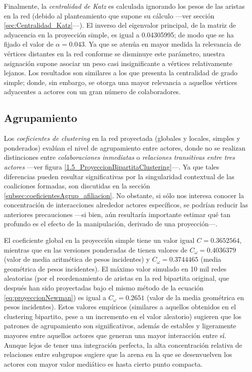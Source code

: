 \documentclass[letterpaper, 11pt]{book}
\theoremstyle{definition}
\theoremstyle{remark}
\begin{document}
Finalmente, la \emph{centralidad de Katz} es calculada ignorando los pesos de las aristas en la red (debido al planteamiento que supone su cálculo ---ver sección \ref{sec:Centralidad_Katz}---). 
El inverso del eigenvalor principal, de la matriz de adyacencia en la proyección simple, es igual a 0.04305995; de modo que se ha fijado el valor de $\alpha=0.043$. 
Ya que se atenúa en mayor medida la relevancia de vértices distantes en la red conforme se disminuye este parámetro, nuestra asignación supone asociar un peso casi insignificante a vértices relativamente lejanos. 
Los resultados son similares a los que presenta la centralidad de grado simple; donde, sin embargo, se otorga una mayor relevancia a aquellos vértices adyacentes a actores con un gran número de colaboradores. 






\subsection{Agrupamiento}
\label{subsec:agrupamiento__proyec}

Los \emph{coeficientes de clustering} en la red proyectada (globales y locales, simples y ponderados) evalúan el nivel de agrupamiento entre actores, donde no se realizan distinciones entre \emph{colaboraciones inmediatas} o \emph{relaciones transitivas entre tres actores} ---ver figura \ref{1.5_ProyeccionBipartitaClustering}---. 
Ya que tales diferencias pueden resultar significativas por la singularidad contextual de las coaliciones formadas, son discutidas en la sección \ref{subsec:coeficientesAgrup_afiliacion}. 
No obstante, si sólo nos interesa conocer la concentración de interacciones alrededor actores específicos, se podrían reducir las anteriores precauciones ---si bien, aún resultaría importante estimar qué tan profundo es el efecto de la manipulación, derivado de una proyección---. 


El coeficiente global en la proyección simple tiene un valor igual $C = 0.3652564$, mientras que en las versiones ponderadas de \citet{2009_Clustering_Opsahl} tienen valores de $C_{\omega} = 0.4036379$ (valor de media aritmética de pesos incidentes) y $C_{\omega} = 0.3744465$ (media geométrica de pesos incidentes). 
El máximo valor simulado en 10 mil redes aleatorias (por el reordenamiento de aristas en la red bipartita original, que después han sido proyectadas bajo el mismo método de la ecuación \ref{eq:proyeccionNewman}) es igual a $C_{\omega}= 0.2651$ (valor de la media geométrica en pesos incidentes). 
Estos valores empíricos (similares a aquellos obtenidos en el  clustering bipartito, pese a un incremento en el valor aleatorio) sugieren que los patrones de agrupamiento son significativos, además de estables y ligeramente mayores entre aquellos actores que generan una mayor interacción entre sí. 
Aunque lejos de tener una integración perfecta, la alta concentración relativa de relaciones entre subgrupos sugiere que la arena en la que se desenvuelven los actores con mayor valor mediático es hasta cierto punto compacta. 
\end{document}
